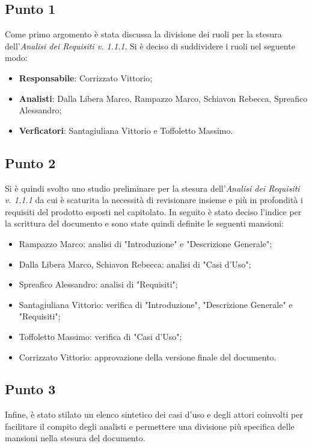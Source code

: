     \subsection{Punto 1}
        Come primo argomento è stata discussa la divisione dei ruoli per la stesura dell'\textit{Analisi dei Requisiti v. 1.1.1}. Si è deciso di suddividere i ruoli nel seguente modo:
        \begin{itemize}
            \item \textbf{Responsabile}: Corrizzato Vittorio;
            \item \textbf{Analisti}: Dalla Libera Marco, Rampazzo Marco, Schiavon Rebecca, Spreafico Alessandro;
            \item \textbf{Verficatori}: Santagiuliana Vittorio e Toffoletto Massimo. 
        \end{itemize}
    \subsection{Punto 2}
        Si è quindi svolto uno studio preliminare per la stesura dell'\textit{Analisi dei Requisiti v. 1.1.1} da cui è scaturita la necessità di revisionare insieme e più in profondità i requisiti del prodotto esposti nel capitolato. In seguito è stato deciso l'indice per la scrittura del documento e sono state quindi definite le seguenti mansioni:
        \begin{itemize}
        	\item Rampazzo Marco: analisi di "Introduzione" e "Descrizione Generale";
        	\item Dalla Libera Marco, Schiavon Rebecca: analisi di "Casi d'Uso";
        	\item Spreafico Alessandro: analisi di "Requisiti";
        	\item Santagiuliana Vittorio: verifica di "Introduzione", "Descrizione Generale" e "Requisiti";
        	\item Toffoletto Massimo: verifica di "Casi d'Uso";
        	\item Corrizzato Vittorio: approvazione della versione finale del documento.
        \end{itemize}
    \subsection{Punto 3}
    Infine, è stato stilato un elenco sintetico dei casi d'uso e degli attori coinvolti per facilitare il compito degli analisti e permettere una divisione più specifica delle mansioni nella stesura del documento.